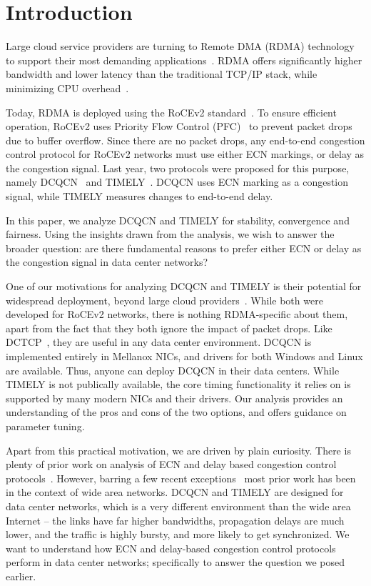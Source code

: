 \section{Introduction}

Large cloud service providers are turning to Remote DMA (RDMA) technology to
support their most demanding applications~\cite{dcqcn,timely,tcp-bolt}.  RDMA
offers significantly higher bandwidth and lower latency than the traditional
TCP/IP stack, while minimizing CPU overhead~\cite{dcqcn,farm,timely}. 

Today, RDMA is deployed using the RoCEv2 standard~\cite{rocev2}. To ensure
efficient operation, RoCEv2 uses Priority Flow Control (PFC)~\cite{pfc} to
prevent packet drops due to buffer overflow.  Since there are no packet drops,
any end-to-end congestion control protocol for RoCEv2 networks must use either
ECN markings, or delay as the congestion signal.  Last year, two protocols were
proposed for this purpose, namely DCQCN~\cite{dcqcn} and TIMELY~\cite{timely}.
DCQCN uses ECN marking as a congestion signal, while TIMELY measures changes to
end-to-end delay.


In this paper, we analyze DCQCN and TIMELY for stability, convergence and
fairness. Using the insights drawn from the analysis, we wish to answer the
broader question: are there fundamental reasons to prefer either ECN or delay as
the congestion signal in data center networks?


One of our motivations for analyzing DCQCN and TIMELY is their potential for
widespread deployment, beyond large cloud providers~\cite{dcqcn, timely}.  While
both were developed for RoCEv2 networks, there is nothing RDMA-specific about
them, apart from the fact that they both ignore the impact of packet drops. Like
DCTCP~\cite{dctcp}, they are useful in any data center environment.  DCQCN is
implemented entirely in Mellanox NICs, and drivers for both Windows and Linux
are available.  Thus, anyone can deploy DCQCN in their data
centers. While TIMELY is not publically available, the core timing functionality
it relies on is supported by many modern NICs and their drivers. Our analysis
provides an understanding of the pros and cons of the two options, and offers
guidance on parameter tuning.

Apart from this practical motivation, we are driven by plain curiosity. There is
plenty of prior work on analysis of ECN and delay based congestion control
protocols~\cite{ecn,
tcp-vegas,misra2000fluid,hollot2001designing,misra:TAC2002,gorinsky2004feedback}.
However, barring a few recent exceptions~\cite{dctcp-analysis, qcn-analysis}
most prior work has been in the context of wide area networks. DCQCN and TIMELY
are designed for data center networks, which is a very different environment
than the wide area Internet -- the links have far higher bandwidths, propagation
delays are much lower, and the traffic is highly bursty, and more likely to get
synchronized.  We want to understand how ECN and delay-based congestion control
protocols perform in data center networks; specifically to answer the question
we posed earlier.

